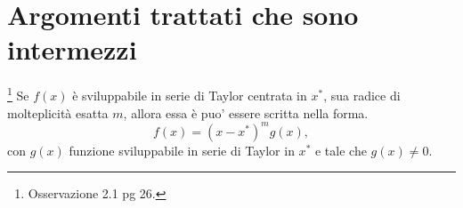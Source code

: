 \section{Argomenti trattati che sono intermezzi}
\begin{remark}\footnote{Osservazione 2.1 pg 26.}\label{rem:formaF}
Se $f(x)$ è sviluppabile in serie di Taylor centrata in $x^*$, sua radice di molteplicità esatta $m$, allora essa è puo' essere scritta nella forma.
\begin{equation}
    f(x)=(x-x^*)^mg(x),
\end{equation}
con $g(x)$ funzione sviluppabile in serie di Taylor in $x^*$ e tale che $g(x)\neq 0$.
\end{remark}